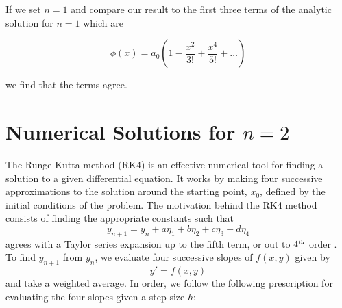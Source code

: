 \documentclass[12pt, manuscript]{article}
\begin{document}
If we set $n=1$ and compare our result to the first three terms of the analytic solution for $n=1$ which are

\begin{equation}
\phi \left( x \right) = a_0 \left(1 - \frac{x^2}{3!} + \frac{x^4}{5!} + \dots \right)
\end{equation}

we find that the terms agree.

\section*{Numerical Solutions for $n = 2$}
    The Runge-Kutta method (RK4) is an effective numerical tool for finding a solution to a given differential equation. It works by making four successive approximations to the solution around the starting point, $x_{0}$, defined by the initial conditions of the problem.
    The motivation behind the RK4 method consists of finding the appropriate constants such that 
    \begin{equation}
        y_{n+1} = y_n + a\eta_1 + b\eta_2 + c\eta_3 + d\eta_4
    \end{equation}
    agrees with a Taylor series expansion up to the fifth term, or out to $4^{\text{\tiny{th}}}$ order \cite{zill}. To find $y_{n+1}$ from $y_n$, we evaluate four successive slopes of $f(x, y)$ given by
    \begin{equation}
        y' = f(x, y)
    \end{equation}
    and take a weighted average. In order, we follow the following prescription \cite{blanch} for evaluating the four slopes given a step-size $h$:
\end{document}
